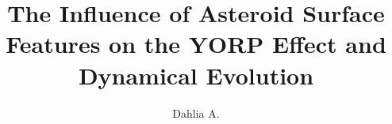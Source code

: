 \documentclass[defaultstyle,11pt]{thesis}
\title{The Influence of Asteroid Surface Features on the YORP Effect and Dynamical Evolution}
\author{Dahlia A.}{Baker}
\begin{document}








\nocite{*}		%

\appendix


\end{document}
